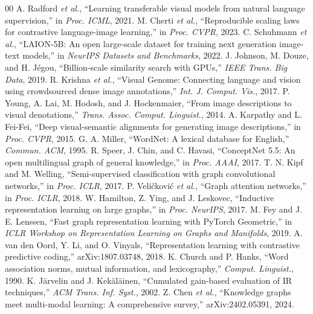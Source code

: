 \begin{thebibliography}{00}
 A. Radford \textit{et al.}, ``Learning transferable visual models from natural language supervision,'' in \textit{Proc. ICML}, 2021.
 M. Cherti \textit{et al.}, ``Reproducible scaling laws for contrastive language-image learning,'' in \textit{Proc. CVPR}, 2023.
 C. Schuhmann \textit{et al.}, ``LAION-5B: An open large-scale dataset for training next generation image-text models,'' in \textit{NeurIPS Datasets and Benchmarks}, 2022.
 J. Johnson, M. Douze, and H. Jégou, ``Billion-scale similarity search with GPUs,'' \textit{IEEE Trans. Big Data}, 2019.
 R. Krishna \textit{et al.}, ``Visual Genome: Connecting language and vision using crowdsourced dense image annotations,'' \textit{Int. J. Comput. Vis.}, 2017.
 P. Young, A. Lai, M. Hodosh, and J. Hockenmaier, ``From image descriptions to visual denotations,'' \textit{Trans. Assoc. Comput. Linguist.}, 2014.
 A. Karpathy and L. Fei-Fei, ``Deep visual-semantic alignments for generating image descriptions,'' in \textit{Proc. CVPR}, 2015.
 G. A. Miller, ``WordNet: A lexical database for English,'' \textit{Commun. ACM}, 1995.
 R. Speer, J. Chin, and C. Havasi, ``ConceptNet 5.5: An open multilingual graph of general knowledge,'' in \textit{Proc. AAAI}, 2017.
 T. N. Kipf and M. Welling, ``Semi-supervised classification with graph convolutional networks,'' in \textit{Proc. ICLR}, 2017.
 P. Veličković \textit{et al.}, ``Graph attention networks,'' in \textit{Proc. ICLR}, 2018.
 W. Hamilton, Z. Ying, and J. Leskovec, ``Inductive representation learning on large graphs,'' in \textit{Proc. NeurIPS}, 2017.
 M. Fey and J. E. Lenssen, ``Fast graph representation learning with PyTorch Geometric,'' in \textit{ICLR Workshop on Representation Learning on Graphs and Manifolds}, 2019.
 A. van den Oord, Y. Li, and O. Vinyals, ``Representation learning with contrastive predictive coding,'' arXiv:1807.03748, 2018.
 K. Church and P. Hanks, ``Word association norms, mutual information, and lexicography,'' \textit{Comput. Linguist.}, 1990.
 K. Järvelin and J. Kekäläinen, ``Cumulated gain-based evaluation of IR techniques,'' \textit{ACM Trans. Inf. Syst.}, 2002.
 Z. Chen \textit{et al.}, ``Knowledge graphs meet multi-modal learning: A comprehensive survey,'' arXiv:2402.05391, 2024.

\end{thebibliography}
